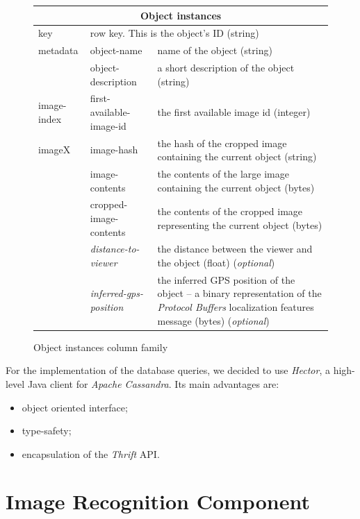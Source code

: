 \documentclass[a4paper,onecolumn,oneside,titlepage,11pt]{report}
\begin{document}
	\begin{figure}[H]
	\begin{center}
		\begin{tabularx}{\linewidth}{|l|l|X|}
				\hline
				\multicolumn{3}{|c|}{\textbf{Object instances}} \\
				\hline
				key & \multicolumn{2}{X|}{row key. This is the object's ID (string)} \\
				\hline
				metadata & object-name & name of the object (string) \\
				& object-description & a short description of the object (string) \\
				\hline
				image-index & first-available-image-id & the first available image id (integer) \\
				\hline
				imageX & image-hash & the hash of the cropped image containing the current object (string) \\
				& image-contents & the contents of the large image containing the current object (bytes) \\
				& cropped-image-contents & the contents of the cropped image representing the current object (bytes) \\
				& \emph{distance-to-viewer} & the distance between the viewer and the object (float) (\emph{optional}) \\
				& \emph{inferred-gps-position} & the inferred GPS position of the object -- a binary representation of the \emph{Protocol Buffers} localization features message (bytes) (\emph{optional}) \\
				\hline
			\end{tabularx}
	\end{center}
	\caption{Object instances column family}
	\end{figure}
For the implementation of the database queries, we decided to use \emph{Hector}, a high-level Java client for \emph{Apache Cassandra}. Its main advantages are:
\begin{itemize}
	\item object oriented interface;
	\item type-safety;
	\item encapsulation of the \emph{Thrift} API.
\end{itemize}
	
\section{Image Recognition Component}
\end{document}
